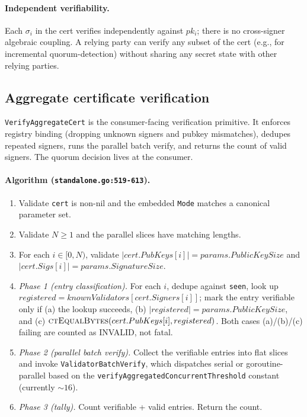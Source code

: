 \paragraph{Independent verifiability.} Each $\sigma_i$ in the cert
verifies independently against $pk_i$; there is no cross-signer
algebraic coupling. A relying party can verify any subset of the
cert (e.g., for incremental quorum-detection) without sharing any
secret state with other relying parties.

\subsection{Aggregate certificate verification}
\label{sec:construction:verifycert}

\texttt{VerifyAggregateCert} is the consumer-facing verification
primitive. It enforces registry binding (dropping unknown signers
and pubkey mismatches), dedupes repeated signers, runs the parallel
batch verify, and returns the count of valid signers. The quorum
decision lives at the consumer.

\paragraph{Algorithm (\texttt{standalone.go:519-613}).}
\begin{enumerate}[leftmargin=2em,nosep]
  \item Validate \texttt{cert} is non-nil and the embedded
        \texttt{Mode} matches a canonical parameter set.
  \item Validate $N \ge 1$ and the parallel slices have matching
        lengths.
  \item For each $i \in [0, N)$, validate $|cert.PubKeys[i]| =
        params.PublicKeySize$ and $|cert.Sigs[i]| =
        params.SignatureSize$.
  \item \emph{Phase 1 (entry classification).} For each $i$, dedupe
        against \texttt{seen}, look up
        $registered = knownValidators[cert.Signers[i]]$; mark the
        entry verifiable only if (a) the lookup succeeds, (b)
        $|registered| = params.PublicKeySize$, and (c)
        $\textsc{ctEqualBytes}(cert.PubKeys[i], registered)$. Both
        cases (a)/(b)/(c) failing are counted as INVALID, not
        fatal.
  \item \emph{Phase 2 (parallel batch verify).} Collect the
        verifiable entries into flat slices and invoke
        \texttt{ValidatorBatchVerify}, which dispatches serial or
        goroutine-parallel based on the
        \texttt{verifyAggregatedConcurrentThreshold} constant
        (currently $\sim 16$).
  \item \emph{Phase 3 (tally).} Count verifiable + valid entries.
        Return the count.
\end{enumerate}

